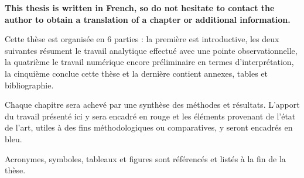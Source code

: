

\textbf{This thesis is written in French, so do not hesitate to contact the author to obtain a translation of a chapter or additional information.} 

Cette thèse est organisée en $\num{6}$ parties : la première est introductive, les deux suivantes résument le travail analytique effectué avec une pointe observationnelle, la quatrième le travail numérique encore préliminaire en termes d'interprétation, la cinquième conclue cette thèse et la dernière contient annexes, tables et bibliographie.  

Chaque chapitre sera achevé par une synthèse des méthodes et résultats. L'apport du travail présenté ici y sera encadré en rouge et les éléments provenant de l'état de l'art, utiles à des fins méthodologiques ou comparatives, y seront encadrés en bleu.   

Acronymes, symboles, tableaux et figures sont référencés et listés à la fin de la thèse. 
